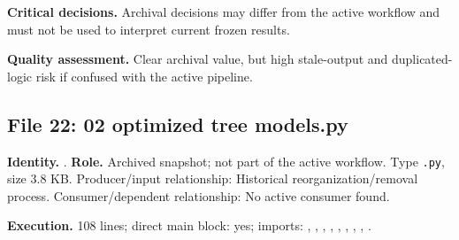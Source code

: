 \documentclass[
  11pt,
  a4paper]{article}
\begin{document}
\textbf{Critical decisions.} Archival decisions may differ from the
active workflow and must not be used to interpret current frozen
results.

\textbf{Quality assessment.} Clear archival value, but high stale-output
and duplicated-logic risk if confused with the active pipeline.

\subsection{File 22: 02 optimized tree
models.py}\label{file-5546771859716903570}

\textbf{Identity.}
.
\textbf{Role.} Archived snapshot; not part of the active workflow. Type
\texttt{.py}, size 3.8 KB. Producer/input relationship: Historical
reorganization/removal process. Consumer/dependent relationship: No
active consumer found.

\textbf{Execution.} 108 lines; direct main block: yes; imports:
, ,
,
,
,
,
,
, .
\end{document}
